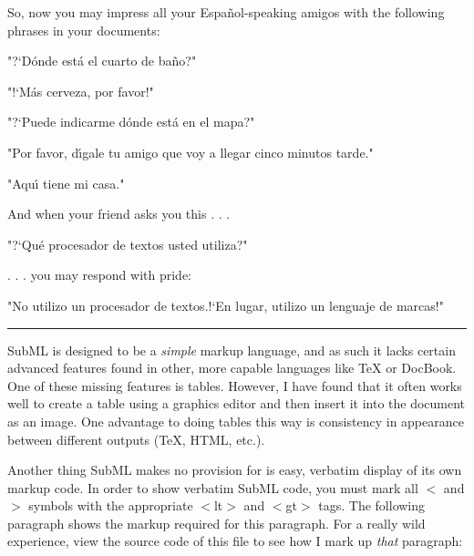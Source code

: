 So, now you may impress all your Espa\~nol-speaking amigos with the following phrases in your documents:
 

\bigskip 
\vskip 10pt {\narrower \noindent \baselineskip5pt
"?`D\'onde est\'a el cuarto de ba\~no?"
\par} \vskip 10pt
\bigskip 
\vskip 10pt {\narrower \noindent \baselineskip5pt
"!`M\'as cerveza, por favor!"
\par} \vskip 10pt
\bigskip 
\vskip 10pt {\narrower \noindent \baselineskip5pt
"?`Puede indicarme d\'onde est\'a en el mapa?"
\par} \vskip 10pt
\bigskip 
\vskip 10pt {\narrower \noindent \baselineskip5pt
"Por favor, d\'\i{}gale tu amigo que voy a llegar cinco minutos tarde."
\par} \vskip 10pt
\bigskip 
\vskip 10pt {\narrower \noindent \baselineskip5pt
"Aqu\'\i{} tiene mi casa."
\par} \vskip 10pt
\bigskip 
 

And when your friend asks you this . . .
 

\vskip 10pt {\narrower \noindent \baselineskip5pt
"?`Qu\'e procesador de textos usted utiliza?"
\par} \vskip 10pt
 

. . . you may respond with pride:
 

\vskip 10pt {\narrower \noindent \baselineskip5pt
"No utilizo un procesador de textos.!`En lugar, utilizo un lenguaje de marcas!"
\par} \vskip 10pt

\vfil \eject 
\bigskip \hrule \bigskip 
\noindent {} \bigskip 
 

SubML is designed to be a {\it simple} markup language, and as such it lacks certain advanced features found in other, more capable languages like \TeX{} or DocBook.  One of these missing features is tables.  However, I have found that it often works well to create a table using a graphics editor and then insert it into the document as an image.  One advantage to doing tables this way is consistency in appearance between different outputs (\TeX{}, HTML, etc.). 
 

 

Another thing SubML makes no provision for is easy, verbatim display of its own markup code.  In order to show verbatim SubML code, you must mark all $<$ and $>$ symbols with the appropriate $<$lt$>$ and $<$gt$>$ tags.  The following paragraph shows the markup required for this paragraph.  For a really wild experience, view the source code of this file to see how I mark up {\it that} paragraph:
 

